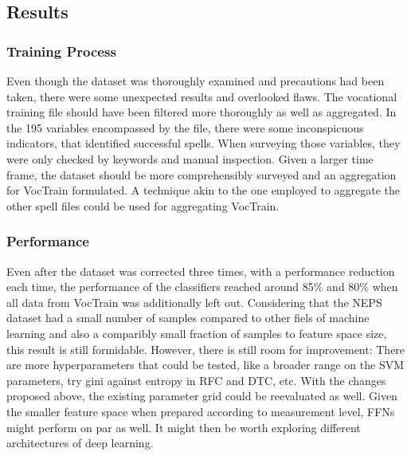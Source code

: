 \subsection{Results}
\subsubsection{Training Process}
Even though the dataset was thoroughly examined and precautions had been taken, there were some unexpected results and overlooked flaws. The vocational training file should have been filtered more thoroughly as well as aggregated. In the 195 variables encompassed by the file, there were some inconspicuous indicators, that identified successful spells. When surveying those variables, they were only checked by keywords and manual inspection. Given a larger time frame, the dataset should be more comprehensibly surveyed and an aggregation for VocTrain formulated. A technique akin to the one employed to aggregate the other spell files could be used for aggregating VocTrain.

\subsubsection{Performance}
Even after the dataset was corrected three times, with a performance reduction each time, the performance of the classifiers reached around 85\% and 80\% when all data from VocTrain was additionally left out. Considering that the NEPS dataset had a small number of samples compared to other fiels of machine learning and also a comparibly small fraction of samples to feature space size, this result is still formidable. However, there is still room for improvement: There are more hyperparameters that could be tested, like a broader range on the SVM parameters, try gini against entropy in RFC and DTC, etc. With the changes proposed above, the existing parameter grid could be reevaluated as well. Given the smaller feature space when prepared according to measurement level, FFNs might perform on par as well. It might then be worth exploring different architectures of deep learning.


